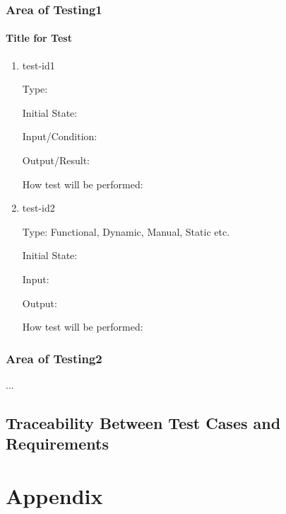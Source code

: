 \documentclass[12pt, titlepage]{article}
\begin{document}

\subsubsection{Area of Testing1}
		
\paragraph{Title for Test}

\begin{enumerate}

\item{test-id1\\}

Type: 
					
Initial State: 
					
Input/Condition: 
					
Output/Result: 
					
How test will be performed: 
					
\item{test-id2\\}

Type: Functional, Dynamic, Manual, Static etc.
					
Initial State: 
					
Input: 
					
Output: 
					
How test will be performed: 

\end{enumerate}

\subsubsection{Area of Testing2}

...

\subsection{Traceability Between Test Cases and Requirements}

				




\newpage

\section{Appendix}
\end{document}
